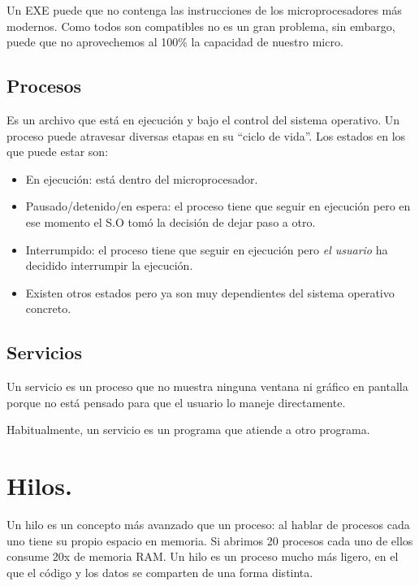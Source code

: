 \documentclass[a4paper,12pt,spanish]{sphinxmanual}
\begin{document}
Un EXE puede que no contenga las instrucciones de los microprocesadores más modernos. Como todos son compatibles no es un gran problema, sin embargo, puede que no aprovechemos al 100\% la capacidad de nuestro micro.


\section{Procesos}
\label{textos/tema1:procesos}
Es un archivo que está en ejecución y bajo el control del sistema operativo. Un proceso puede atravesar diversas etapas en su ``ciclo de vida''. Los estados en los que puede estar son:
\begin{itemize}
\item {} 
En ejecución: está dentro del microprocesador.

\item {} 
Pausado/detenido/en espera: el proceso tiene que seguir en ejecución pero en ese momento el S.O tomó la decisión de dejar paso a otro.

\item {} 
Interrumpido: el proceso tiene que seguir en ejecución pero \emph{el usuario} ha decidido interrumpir la ejecución.

\item {} 
Existen otros estados pero ya son muy dependientes del sistema operativo concreto.

\end{itemize}


\section{Servicios}
\label{textos/tema1:servicios}
Un servicio es un proceso que no muestra ninguna ventana ni gráfico en pantalla porque no está pensado para que el usuario lo maneje directamente.

Habitualmente, un servicio es un programa que atiende a otro programa.


\chapter{Hilos.}
\label{textos/tema1:hilos}
Un hilo es un concepto más avanzado que un proceso: al hablar de procesos cada uno tiene su propio espacio en memoria. Si abrimos 20 procesos cada uno de ellos consume 20x de memoria RAM. Un hilo es un proceso mucho más ligero, en el que el código y los datos se comparten de una forma distinta.
\end{document}
